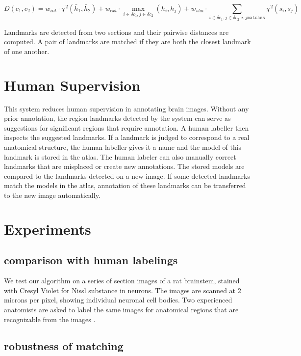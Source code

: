 \documentclass{llncs}
\begin{document}
$$D(c_1, c_2) = w_{int} \cdot \chi^2(\bar{h}_1, \bar{h}_2) + 
w_{ext} \cdot \max_{i \in \delta c_1, j\in \delta c_2}(h_i, h_j) +
w_{sha} \cdot \sum_{i \in \delta c_1, j \in \delta c_2, i, j \mathtt{matches}} \chi^2(s_i, s_j)
$$

Landmarks are detected from two sections and their pairwise distances are computed. A pair of landmarks are matched if they are both the closest landmark of one another.

\section{Human Supervision}

This system reduces human supervision in annotating brain images. Without any prior annotation, the region landmarks detected by the system can serve as suggestions for significant regions that require annotation. A human labeller then inspects the suggested landmarks. If a landmark is judged to correspond to a real anatomical structure, the human labeller gives it a name and the model of this landmark is stored in the atlas. The human labeler can also manually correct landmarks that are misplaced or create new annotations.
The stored models are compared to the landmarks detected on a new image. If some detected landmarks match the models in the atlas, annotation of these landmarks can be transferred to the new image automatically.



\section{Experiments}

\subsection{comparison with human labelings}

We test our algorithm on a series of section images of a rat brainstem, stained with Cresyl Violet for Nissl substance in neurons. The images are scanned at 2 microns per pixel, showing individual neuronal cell bodies. Two experienced anatomists are asked to label the same images for anatomical regions that are recognizable from the images .

\subsection{robustness of matching}
\end{document}
